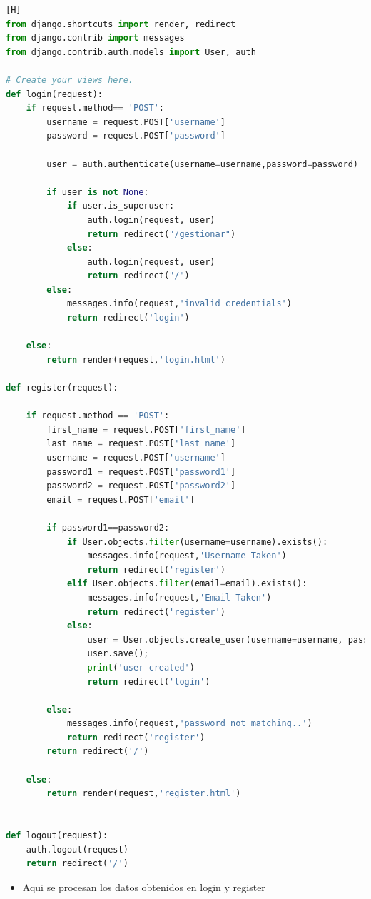 \documentclass{article}
\begin{document}
	\begin{lstlisting}[language=Python,caption={Codigo de views.py de accounts}][H]
from django.shortcuts import render, redirect
from django.contrib import messages
from django.contrib.auth.models import User, auth

# Create your views here.
def login(request):
    if request.method== 'POST':
        username = request.POST['username']
        password = request.POST['password']

        user = auth.authenticate(username=username,password=password)

        if user is not None:
            if user.is_superuser:
                auth.login(request, user)
                return redirect("/gestionar")   
            else:
                auth.login(request, user)
                return redirect("/")
        else:
            messages.info(request,'invalid credentials')
            return redirect('login')

    else:
        return render(request,'login.html')    

def register(request):

    if request.method == 'POST':
        first_name = request.POST['first_name']
        last_name = request.POST['last_name']
        username = request.POST['username']
        password1 = request.POST['password1']
        password2 = request.POST['password2']
        email = request.POST['email']

        if password1==password2:
            if User.objects.filter(username=username).exists():
                messages.info(request,'Username Taken')
                return redirect('register')
            elif User.objects.filter(email=email).exists():
                messages.info(request,'Email Taken')
                return redirect('register')
            else:   
                user = User.objects.create_user(username=username, password=password1, email=email,first_name=first_name,last_name=last_name)
                user.save();
                print('user created')
                return redirect('login')

        else:
            messages.info(request,'password not matching..')    
            return redirect('register')
        return redirect('/')
        
    else:
        return render(request,'register.html')


def logout(request):
    auth.logout(request)
    return redirect('/')       
	\end{lstlisting}
	\begin{itemize}
		\item Aqui se procesan los datos obtenidos en login y register
	\end{itemize}	
	
	
\end{document}
